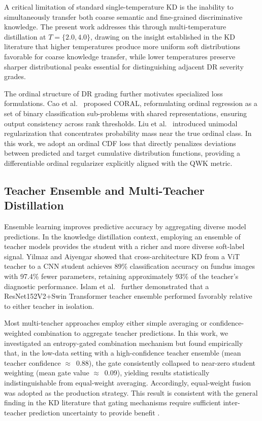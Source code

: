 \documentclass[a4paper,fleqn]{cas-dc}
\begin{document}
A critical limitation of standard single-temperature KD is the inability to simultaneously transfer both coarse semantic and fine-grained discriminative knowledge. The present work addresses this through multi-temperature distillation at $T = \{2.0, 4.0\}$, drawing on the insight established in the KD literature \cite{hinton2015,gou2021} that higher temperatures produce more uniform soft distributions favorable for coarse knowledge transfer, while lower temperatures preserve sharper distributional peaks essential for distinguishing adjacent DR severity grades.

The ordinal structure of DR grading further motivates specialized loss formulations. Cao et al.\ \cite{cao2020} proposed CORAL, reformulating ordinal regression as a set of binary classification sub-problems with shared representations, ensuring output consistency across rank thresholds. Liu et al.\ \cite{liu2020} introduced unimodal regularization that concentrates probability mass near the true ordinal class. In this work, we adopt an ordinal CDF loss that directly penalizes deviations between predicted and target cumulative distribution functions, providing a differentiable ordinal regularizer explicitly aligned with the QWK metric.

\subsection{Teacher Ensemble and Multi-Teacher Distillation}

Ensemble learning improves predictive accuracy by aggregating diverse model predictions. In the knowledge distillation context, employing an ensemble of teacher models provides the student with a richer and more diverse soft-label signal. Yilmaz and Aiyengar \cite{yilmaz2025} showed that cross-architecture KD from a ViT teacher to a CNN student achieves 89\% classification accuracy on fundus images with 97.4\% fewer parameters, retaining approximately 93\% of the teacher's diagnostic performance. Islam et al.\ \cite{islam2023} further demonstrated that a ResNet152V2+Swin Transformer teacher ensemble performed favorably relative to either teacher in isolation.

Most multi-teacher approaches employ either simple averaging or confidence-weighted combination to aggregate teacher predictions. In this work, we investigated an entropy-gated combination mechanism but found empirically that, in the low-data setting with a high-confidence teacher ensemble (mean teacher confidence $\approx$~0.88), the gate consistently collapsed to near-zero student weighting (mean gate value $\approx$~0.09), yielding results statistically indistinguishable from equal-weight averaging. Accordingly, equal-weight fusion was adopted as the production strategy. This result is consistent with the general finding in the KD literature that gating mechanisms require sufficient inter-teacher prediction uncertainty to provide benefit \cite{gou2021}.
\end{document}
